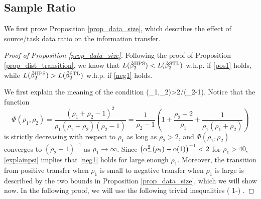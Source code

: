 \subsection{Sample Ratio} \label{app_proof_32}
We first prove Proposition \ref{prop_data_size}, which describes the effect of source/task data ratio on the information transfer. 

\begin{proof}[Proof of Proposition \ref{prop_data_size}]
Following the proof of Proposition \ref{prop_dist_transition}, we know that $L(\hat{\beta}_2^{\textup{HPS}})< L(\hat{\beta}_2^{\textup{STL}})$ w.h.p. if \eqref{pos1} holds, while $L(\hat{\beta}_2^{\textup{HPS}})>L(\hat{\beta}_2^{\textup{STL}})$ w.h.p. if \eqref{neg1} holds. 

We first explain the meaning of the condition 
\be\label{explainpsi}\Psi(\beta_1,\beta_2)>2/(\rho_2-1).\ee 
Notice that the function
$$ \Phi(\rho_1, \rho_2)=\frac{(\rho_1 + \rho_2 - 1)^2}{\rho_1 (\rho_1 + \rho_2) (\rho_2 - 1)}=\frac{1}{\rho_2-1} \left(1 +\frac{\rho_2-2}{\rho_1}+\frac{1}{\rho_1(\rho_1+\rho_2)}\right)$$
is strictly decreasing with respect to $\rho_1$ as long as $\rho_2> 2$, and $ \Phi(\rho_1, \rho_2)$ converges to $(\rho_2-1)^{-1}$ as $\rho_1\to \infty$. Since $\left( \alpha_-^2(\rho_1) -  \operatorname{o}(1) \right)^{-1} < 2$ for $\rho_1>40$,  \eqref{explainpsi} implies that \eqref{neg1} holds for large enough $\rho_1$. Moreover, the transition from positive transfer when $\rho_1$ is small to negative transfer when $\rho_1$ is large is described by the two bounds in Proposition \ref{prop_data_size}, which we will show now. 
In the following proof, we will use the following trivial inequalities 
\be\label{trivialphi}
\cdot \left( 1-\right) \le  {} \le  {}.
\ee


\end{proof}
